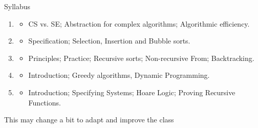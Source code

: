 \begin{frame}{Syllabus}\label{Plan}
  \begin{enumerate}
  \item {}
    \begin{itemize}
    \item CS vs. SE; Abstraction for complex algorithms; Algorithmic efficiency.
    \end{itemize}

  \item {}
    \begin{itemize}
    \item Specification; Selection, Insertion and Bubble sorts.
    \end{itemize}

  \item {}
    \begin{itemize}
    \item Principles; Practice; Recursive sorts; Non-recursive From;
      Backtracking.
    \end{itemize}

  \item {}
    \begin{itemize}
    \item Introduction; Greedy algorithms, Dynamic Programming.
    \end{itemize}

  \item {}
    \begin{itemize}
    \item Introduction; Specifying Systems; Hoare Logic; Proving Recursive
      Functions. 
    \end{itemize}


  \end{enumerate}

  \bigskip
  \centerline{This may change a bit to adapt and improve the class}
\end{frame}





